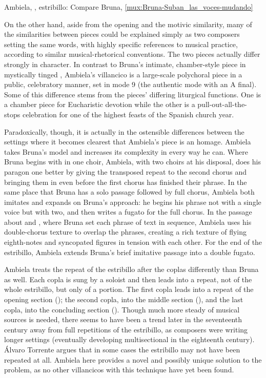 {Ambiela, , estribillo: Compare Bruna,
\cref{mux:Bruna-Suban_las_voces-mudando}}

On the other hand, aside from the opening and the motivic similarity, many of
the similarities between pieces could be explained simply as two composers
setting the same words, with highly specific references to musical practice,
according to similar musical-rhetorical conventions.
The two pieces actually differ strongly in character.
In contrast to Bruna's intimate, chamber-style piece in mystically tinged
, Ambiela's villancico is a large-scale polychoral piece in
a public, celebratory manner, set in mode 9 (the authentic mode with an A
final).
Some of this difference stems from the pieces' differing liturgical functions. 
One is a chamber piece for Eucharistic devotion while the other is a
pull-out-all-the-stops celebration for one of the highest feasts of the Spanish
church year.

Paradoxically, though, it is actually in the ostensible differences between the
settings where it becomes clearest that Ambiela's piece is an homage.
Ambiela takes Bruna's model and increases its complexity in every way he can.
Where Bruna begins with  in one choir, Ambiela, with two choirs
at his disposal, does his paragon one better by giving the transposed repeat to
the second chorus and bringing them in even before the first chorus has
finished their phrase.
In the same place that Bruna has a solo passage followed by full chorus,
Ambiela both imitates and expands on Bruna's approach: he begins his phrase not
with a single voice but with two, and then writes a fugato for the full chorus.
In the passage about  and , where Bruna set
each phrase of text in sequence, Ambiela uses his double-chorus texture to
overlap the phrases, creating a rich texture of flying eighth-notes and
syncopated figures in tension with each other.
For the end of the estribillo, Ambiela extends Bruna's brief imitative passage
into a double fugato.

Ambiela treats the repeat of the estribillo after the coplas differently than
Bruna as well.
Each copla is sung by a soloist and then leads into a repeat, not of the whole
estribillo, but only of a portion.
The first copla leads into a repeat of the
opening section (); the second copla, into the middle section
(), and the last copla, into the concluding section
().
Though much more steady of musical sources is needed, there seems to have been
a trend later in the seventeenth century away from full repetitions of the
estribillo, as composers were writing longer settings (eventually developing
multisectional  in the eighteenth century).
Álvaro Torrente argues that in some cases the estribillo may not have been
repeated at all.%
Ambiela here provides a novel and possibly unique solution to the problem, as
no other villancicos with this technique have yet been found.


